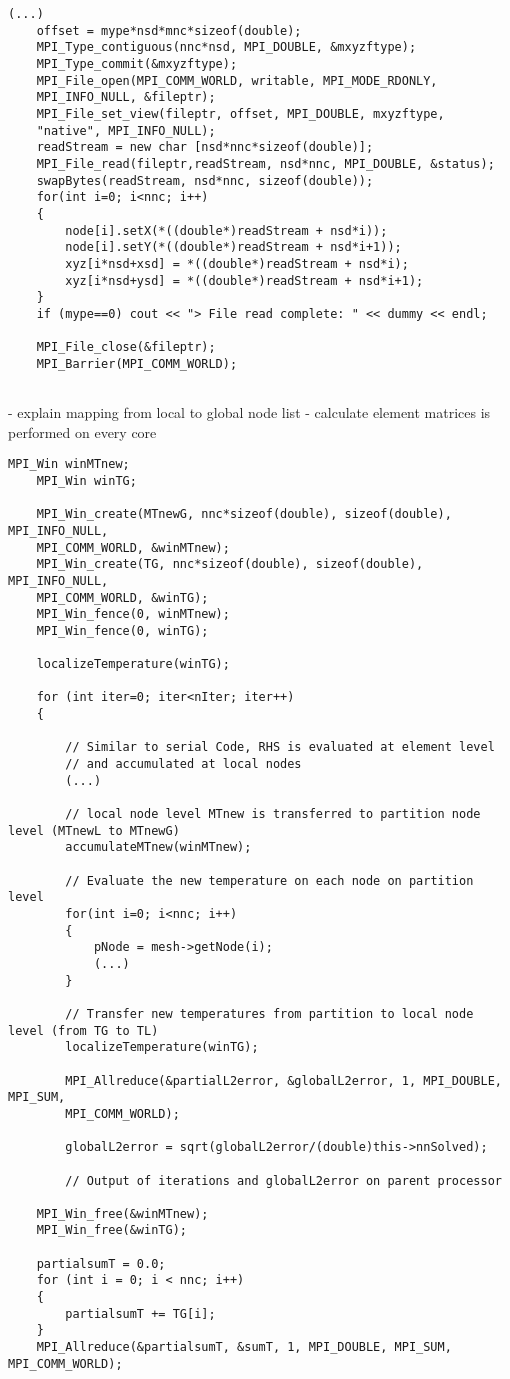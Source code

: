 \begin{lstlisting}[caption={\label{Code:MPI2} Read file for every rank with specific offset}]
	(...)
	offset = mype*nsd*mnc*sizeof(double);
	MPI_Type_contiguous(nnc*nsd, MPI_DOUBLE, &mxyzftype);
	MPI_Type_commit(&mxyzftype);
	MPI_File_open(MPI_COMM_WORLD, writable, MPI_MODE_RDONLY, 
	MPI_INFO_NULL, &fileptr);
	MPI_File_set_view(fileptr, offset, MPI_DOUBLE, mxyzftype, 
	"native", MPI_INFO_NULL);
	readStream = new char [nsd*nnc*sizeof(double)];
	MPI_File_read(fileptr,readStream, nsd*nnc, MPI_DOUBLE, &status);
	swapBytes(readStream, nsd*nnc, sizeof(double));
	for(int i=0; i<nnc; i++)
	{
		node[i].setX(*((double*)readStream + nsd*i));
		node[i].setY(*((double*)readStream + nsd*i+1));
		xyz[i*nsd+xsd] = *((double*)readStream + nsd*i);
		xyz[i*nsd+ysd] = *((double*)readStream + nsd*i+1);
	}
	if (mype==0) cout << "> File read complete: " << dummy << endl;
	
	MPI_File_close(&fileptr);
	MPI_Barrier(MPI_COMM_WORLD);
	
\end{lstlisting}

- explain mapping from local to global node list
- calculate element matrices is performed on every core

\begin{lstlisting}[caption={\label{Code:MPI3} Explicit solver for MPI parallelization}]
	MPI_Win winMTnew;
	MPI_Win winTG;
	
	MPI_Win_create(MTnewG, nnc*sizeof(double), sizeof(double), MPI_INFO_NULL, 
	MPI_COMM_WORLD, &winMTnew);
	MPI_Win_create(TG, nnc*sizeof(double), sizeof(double), MPI_INFO_NULL, 
	MPI_COMM_WORLD, &winTG);
	MPI_Win_fence(0, winMTnew);
	MPI_Win_fence(0, winTG);
	
	localizeTemperature(winTG);
	
	for (int iter=0; iter<nIter; iter++)
	{
		
		// Similar to serial Code, RHS is evaluated at element level
		// and accumulated at local nodes
		(...)
		 
		// local node level MTnew is transferred to partition node level (MTnewL to MTnewG)
		accumulateMTnew(winMTnew);
		
		// Evaluate the new temperature on each node on partition level
		for(int i=0; i<nnc; i++)
		{
			pNode = mesh->getNode(i);
			(...)
		}
		
		// Transfer new temperatures from partition to local node level (from TG to TL)
		localizeTemperature(winTG);
		
		MPI_Allreduce(&partialL2error, &globalL2error, 1, MPI_DOUBLE, MPI_SUM, 
		MPI_COMM_WORLD);
		
		globalL2error = sqrt(globalL2error/(double)this->nnSolved);
		
		// Output of iterations and globalL2error on parent processor
	
	MPI_Win_free(&winMTnew);
	MPI_Win_free(&winTG);
	
	partialsumT = 0.0;
	for (int i = 0; i < nnc; i++)
	{
		partialsumT += TG[i];
	}
	MPI_Allreduce(&partialsumT, &sumT, 1, MPI_DOUBLE, MPI_SUM, MPI_COMM_WORLD);
\end{lstlisting}

